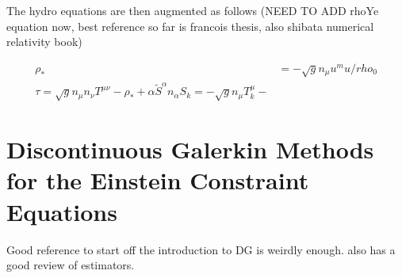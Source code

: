 \documentclass{ut-thesis}
\begin{document}
The hydro equations are then augmented as follows (NEED TO ADD rhoYe equation now, best reference so far is francois thesis, also shibata numerical relativity book)

\begin{align}
  \rho_* &= -\sqrt{g}n_\mu u^mu /rho_0 \\
 \tau = \sqrt{g}n_\mu n_\nu T^{\mu\nu} - \rho_* + \alpha\widetilde{S}^\alpha n_\alpha
  S_k = -\sqrt{g}n_\mu T^\mu_k -
\end{align}

\section{Discontinuous Galerkin Methods for the Einstein Constraint Equations}

Good reference to start off the introduction to DG is \cite{stiller2016robust} weirdly enough.
\cite{bi2015posteriori} also has a good review of estimators.











\end{document}
